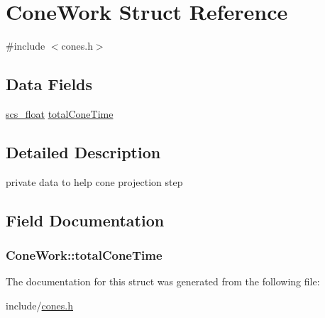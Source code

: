 \hypertarget{struct_cone_work}{\section{Cone\-Work Struct Reference}
\label{struct_cone_work}
}


{\ttfamily \#include $<$cones.\-h$>$}

\subsection*{Data Fields}
\begin{DoxyCompactItemize}
\item 
\hyperlink{glbopts_8h_ad37836e6404bb2c3ae8adcc6290699b9}{scs\-\_\-float} \hyperlink{struct_cone_work_aa6bdbd6d7f54f9b5c3ca04c22c872532}{total\-Cone\-Time}
\end{DoxyCompactItemize}


\subsection{Detailed Description}
private data to help cone projection step 

\subsection{Field Documentation}
\hypertarget{struct_cone_work_aa6bdbd6d7f54f9b5c3ca04c22c872532}{
\subsubsection[{total\-Cone\-Time}]{ Cone\-Work\-::total\-Cone\-Time}}\label{struct_cone_work_aa6bdbd6d7f54f9b5c3ca04c22c872532}


The documentation for this struct was generated from the following file\-:\begin{DoxyCompactItemize}
\item 
include/\hyperlink{cones_8h}{cones.\-h}\end{DoxyCompactItemize}
